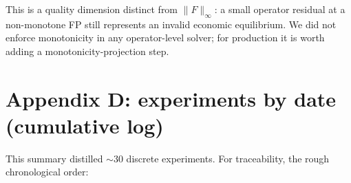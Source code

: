 \documentclass[11pt]{article}
\begin{document}
This is a quality dimension distinct from $\|F\|_\infty$: a small
operator residual at a non-monotone FP still represents an invalid
economic equilibrium. We did not enforce monotonicity in any
operator-level solver; for production it is worth adding a
monotonicity-projection step.

\section{Appendix D: experiments by date (cumulative log)}

This summary distilled $\sim$30 discrete experiments. For
traceability, the rough chronological order:
\end{document}
